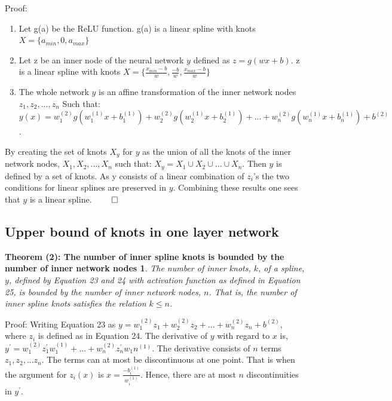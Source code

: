 \documentclass[11pt, letterpaper]{amsart}
\begin{document}
Proof: 
\begin{enumerate}
\item Let g(a) be the ReLU function. g(a) is a linear spline with knots $X = \{ a_{min}, 0, a_{max} \} $
\item Let z be an inner node of the neural network $y$ defined as $z = g(wx + b)$. z is a linear spline with knots $X = \{\frac{x_{min} - b}{w}, \frac{-b}{w}, \frac{x_{max} - b}{w} \} $
\item The whole network $y$ is an affine transformation of the inner network nodes $z_1,z_2,...,z_n$ Such that: $y(x) = w^{(2)}_1g(w_1^{(1)} x + b^{(1)}_1) + w^{(2)}_2g(w_2^{(1)} x + b^{(1)}_2) + ... + w^{(2)}_n g(w_n^{(1)} x + b^{(1)}_n) + b^{(2)}$.
\end{enumerate}
\vspace{0.3cm}

By creating the set of knots $X_y$ for $y$ as the union of all the knots of the inner network nodes, $X_1,X_2,...,X_n$ such that: $X_y = X_1 \cup X_2 \cup ... \cup X_n$. Then $y$ is defined by a set of knots. As y consists of a linear combination of $z_i$'s the two conditions for linear splines are preserved in $y$. Combining these results one sees that $y$ is a linear spline. $\qed$



\subsection{Upper bound of knots in one layer network}
\newtheorem*{mydef8}{Theorem (2): The number of inner spline knots is bounded by the number of inner network nodes}
\begin{mydef8}
The number of inner knots, $k$, of a spline, $y$, defined by Equation 23 and 24 with activation function as defined in Equation 25, is bounded by the number of inner network nodes, $n$. That is, the number of inner spline knots satisfies the relation $k \leq n$.
\end{mydef8}

Proof: Writing Equation 23 as $y = w_1^{(2)} z_1 + w_2^{(2)} z_2 + ... + w_n^{(2)} z_n + b^{(2)} $, where $z_i$ is defined as in Equation 24. The derivative of $y$ with regard to $x$ is,  $y^\prime=w_1^{(2)} z_1^\prime w_1^{(1)} +...+ w_n^{(2)} z_n^\prime w_1n^{(1)}$. The derivative consists of $n$ terms $z_1,z_2,...z_n$. The terms can at most be discontinuous at one point. That is when the argument for $z_i(x)$ is $x = \frac{-b_i^{(1)}}{w_i^{(1)}}$. Hence, there are at most $n$ discontinuities in $y^\prime$.
\\
\end{document}
